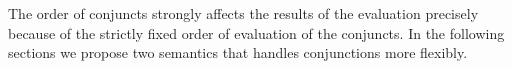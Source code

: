 \begin{comment}
\[
\begin{array}{l}
\inbr{\{\}, 1, \mbox{\lstinline{revers}}^o \, [1] \; \alpha_0 : \epsilon} 
\xrightarrow{\circ} \\
\inbr{\{\alpha_1 = 1; \alpha_2 = []\}, 4, \mbox{\lstinline{revers}}^o \, \alpha_2 \; \alpha_3 : \mbox{\lstinline{append}}^o \, \alpha_3 \; [\alpha_1] \; \alpha_0 : \epsilon}
\xrightarrow{\circ} \\
\inbr{\{\alpha_1 = 1; \alpha_2 = []; \alpha_3 = []\}, 4, \mbox{\lstinline{append}}^o \, \alpha_3 \; [\alpha_1] \; \alpha_0 : \epsilon} 
\xrightarrow{\circ} \\
\inbr{\{\alpha_1 = 1; \alpha_2 = []; \alpha_3 = []\; \alpha_0 = [\alpha_1]\}, \epsilon}
\xrightarrow{\{\alpha_1 = 1; \alpha_2 = []; \alpha_3 = []\; \alpha_0 = [\alpha_1]\}} \emptyset
\end{array}
\]
\end{comment}

The order of conjuncts strongly affects the results of the evaluation precisely because of the strictly fixed order of evaluation of the conjuncts. In the following sections we propose two semantics that handles conjunctions more flexibly.
